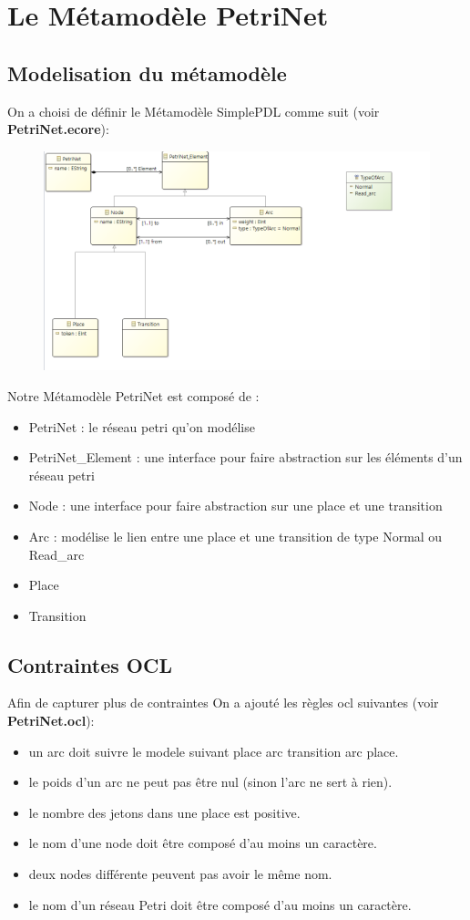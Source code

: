 \documentclass{article}
\begin{document}
\section{Le Métamodèle \textbf{PetriNet}}
\subsection{Modelisation du métamodèle}
On a choisi de définir le Métamodèle SimplePDL comme suit (voir \textbf{PetriNet.ecore}):
\begin{figure}[H]
    \centering
    \includegraphics[width = 18cm]{PetriNet.png}
\end{figure}
Notre Métamodèle PetriNet est composé de : 
\begin{itemize}
    \item PetriNet : le réseau petri qu'on modélise
    \item PetriNet\_Element : une interface pour faire abstraction sur les éléments d'un réseau petri
    \item Node : une interface pour faire abstraction sur une place et une transition
    \item Arc : modélise le lien entre une place et une transition de type Normal ou Read\_arc
    \item Place 
    \item Transition 
\end{itemize}

\subsection{Contraintes OCL}
Afin de capturer plus de contraintes On a ajouté les règles ocl suivantes (voir \textbf{PetriNet.ocl}):
\begin{itemize}
    \item un arc doit suivre le modele suivant place arc transition arc place.
    \item le poids d'un arc ne peut pas être nul (sinon l'arc ne sert à rien).
    \item le nombre des jetons dans une place est positive.
    \item le nom d’une node doit être composé d’au moins un caractère.
    \item deux nodes différente peuvent pas avoir le même nom.
    \item le nom d’un réseau Petri doit être composé d’au moins un caractère.
\end{itemize}
\end{document}
